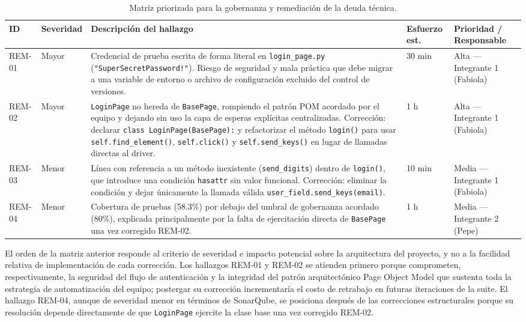 \documentclass[12pt,oneside]{report}
\begin{document}
\begin{table}[H]
\centering
\caption{Matriz priorizada para la gobernanza y remediación de la deuda técnica.}
\small
\begin{tabularx}{\textwidth}{|p{1.6cm}|p{2.0cm}|X|p{1.6cm}|p{2.1cm}|}
\hline
\textbf{ID} & \textbf{Severidad} & \textbf{Descripción del hallazgo} & \textbf{Esfuerzo est.} & \textbf{Prioridad / Responsable} \\
\hline
REM-01 & Mayor & Credencial de prueba escrita de forma literal en \texttt{login\_page.py} (\texttt{"SuperSecretPassword!"}). Riesgo de seguridad y mala práctica que debe migrar a una variable de entorno o archivo de configuración excluido del control de versiones. & 30 min & Alta — Integrante 1 (Fabiola) \\
\hline
REM-02 & Mayor & \texttt{LoginPage} no hereda de \texttt{BasePage}, rompiendo el patrón POM acordado por el equipo y dejando sin uso la capa de esperas explícitas centralizadas. Corrección: declarar \texttt{class LoginPage(BasePage):} y refactorizar el método \texttt{login()} para usar \texttt{self.find\_element()}, \texttt{self.click()} y \texttt{self.send\_keys()} en lugar de llamadas directas al driver. & 1 h & Alta — Integrante 1 (Fabiola) \\
\hline
REM-03 & Menor & Línea con referencia a un método inexistente (\texttt{send\_digits}) dentro de \texttt{login()}, que introduce una condición \texttt{hasattr} sin valor funcional. Corrección: eliminar la condición y dejar únicamente la llamada válida \texttt{user\_field.send\_keys(email)}. & 10 min & Media — Integrante 1 (Fabiola) \\
\hline
REM-04 & Menor & Cobertura de pruebas (58.3\%) por debajo del umbral de gobernanza acordado (80\%), explicada principalmente por la falta de ejercitación directa de \texttt{BasePage} una vez corregido REM-02. & 1 h & Media — Integrante 2 (Pepe) \\
\hline
\end{tabularx}
\end{table}

El orden de la matriz anterior responde al criterio de severidad e impacto potencial sobre la arquitectura del proyecto, y no a la facilidad relativa de implementación de cada corrección. Los hallazgos REM-01 y REM-02 se atienden primero porque comprometen, respectivamente, la seguridad del flujo de autenticación y la integridad del patrón arquitectónico Page Object Model que sustenta toda la estrategia de automatización del equipo; postergar su corrección incrementaría el costo de retrabajo en futuras iteraciones de la suite. El hallazgo REM-04, aunque de severidad menor en términos de SonarQube, se posiciona después de las correcciones estructurales porque su resolución depende directamente de que \texttt{LoginPage} ejercite la clase base una vez corregido REM-02.
\end{document}
